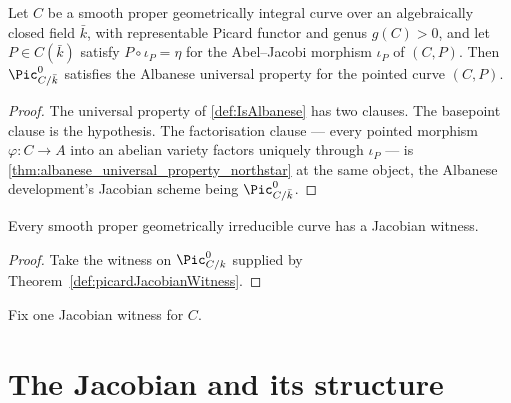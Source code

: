 \begin{lemma}
  \label{lem:pic0_isAlbanese_algClosed}
  Let \(C\) be a smooth proper geometrically integral curve over an
  algebraically closed field \(\bar k\), with representable Picard functor and
  genus \(g(C) > 0\), and let \(P \in C(\bar k)\) satisfy
  \(P \circ \iota_P = \eta\) for the Abel--Jacobi morphism \(\iota_P\) of
  \((C, P)\). Then \(\Pic^0_{C/\bar k}\) satisfies the Albanese universal
  property for the pointed curve \((C, P)\).
\end{lemma}

\begin{proof}
  The universal property of \cref{def:IsAlbanese} has two clauses. The basepoint
  clause is the hypothesis. The factorisation clause --- every pointed morphism
  \(\varphi : C \to A\) into an abelian variety factors uniquely through
  \(\iota_P\) --- is \cref{thm:albanese_universal_property_northstar} at the same
  object, the Albanese development's Jacobian scheme being \(\Pic^0_{C/\bar k}\).
\end{proof}

\begin{theorem}
  \label{thm:nonempty_jacobianWitness}
  Every smooth proper geometrically irreducible curve has a Jacobian witness.
\end{theorem}

\begin{proof}
  Take the witness on \(\Pic^0_{C/k}\) supplied by
  Theorem~\ref{def:picardJacobianWitness}.
\end{proof}

\begin{definition}
  \label{def:jacobianWitness}
  Fix one Jacobian witness for \(C\).
\end{definition}

\section{The Jacobian and its structure}

